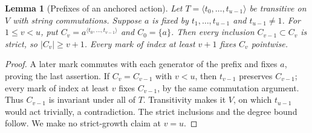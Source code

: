 \documentclass[11pt,a4paper]{article}
\newtheorem{lemma}{Lemma}
\newcommand{\gen}[1]{\langle#1\rangle}
\begin{document}
\begin{lemma}[Prefixes of an anchored action]
Let $T=\gen{t_0,\ldots,t_{u-1}}$ be transitive on $V$
with string commutations. Suppose $a$ is fixed by
$t_1,\ldots,t_{u-1}$ and $t_{u-1}\ne1$.
For $1\le v<u$, put
$C_v=a^{\gen{t_0,\ldots,t_{v-1}}}$ and $C_0=\{a\}$.
Then every inclusion $C_{v-1}\subset C_v$ is strict,
so $|C_v|\ge v+1$. Every mark of index at least
$v+1$ fixes $C_v$ pointwise.
\end{lemma}
\begin{proof}
A later mark commutes with each generator of the
prefix and fixes $a$, proving the last assertion.
If $C_v=C_{v-1}$ with $v<u$, then $t_{v-1}$
preserves $C_{v-1}$; every mark of index at least
$v$ fixes $C_{v-1}$, by the same commutation
argument. Thus $C_{v-1}$ is invariant under all
of $T$. Transitivity makes it $V$, on which
$t_{u-1}$ would act trivially, a contradiction.
The strict inclusions and the degree bound follow.
We make no strict-growth claim at $v=u$.
\end{proof}
\end{document}
